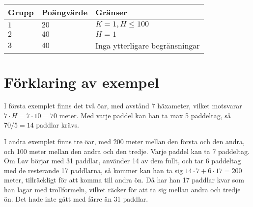\noindent
\begin{tabular}{| l | l | l |}
  \hline
  Grupp & Poängvärde & Gränser \\ \hline
  $1$    & $20$        &  $ K = 1, H \leq 100 $ \\ \hline 
  $2$    & $40$        &  $ H = 1 $ \\ \hline
  $3$    & $40$        &  Inga ytterligare begränsningar \\ \hline
\end{tabular}

\section*{Förklaring av exempel}

I första exemplet finns det två öar, med avstånd 7 häxameter, vilket motsvarar $7\cdot H = 7\cdot 10=70$ meter. Med varje paddel kan han ta max 5 paddeltag, så $70/5 = 14$ paddlar krävs.

I andra exemplet finns tre öar, med 200 meter mellan den första och den andra, och 100 meter mellan den andra och den tredje. Varje paddel kan ta 7 paddeltag. Om Lav börjar med 31 paddlar, använder 14 av dem fullt, och tar 6 paddeltag med de resterande 17 paddlarna, så kommer kan han ta sig $14\cdot 7+6\cdot 17=200$ meter, tillräckligt för att komma till andra ön. Då har han 17 paddlar kvar som han lagar med trollformeln, vilket räcker för att ta sig mellan andra och tredje ön. Det hade inte gått med färre än 31 paddlar.
